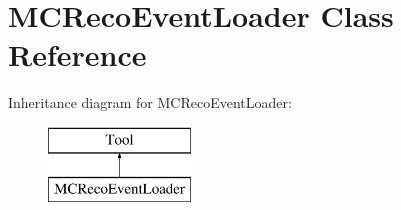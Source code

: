 \hypertarget{classMCRecoEventLoader}{\section{M\-C\-Reco\-Event\-Loader Class Reference}
\label{classMCRecoEventLoader}
}
Inheritance diagram for M\-C\-Reco\-Event\-Loader\-:\begin{figure}[H]
\begin{center}
\leavevmode
\includegraphics[height=2.000000cm]{classMCRecoEventLoader}
\end{center}
\end{figure}

